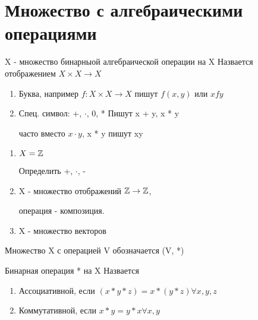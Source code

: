 \section{Множество с алгебраическими операциями}

\begin{definition}
    X - множество бинарныой алгебраической операции на X Назвается отображением $X \times X \to X$
    
    
\end{definition}

\begin{notation}
    \begin{enumerate}
        \item Буква, например $f : X \times X \to X$
        пишут $f(x, y)$ или $x f y$

        \item Спец. символ: +, $\cdot$, 0, *
        Пишут x + y, x * y

        часто вместо $x \cdot y$, x * y пишут xy
    \end{enumerate}

    
\end{notation}

\begin{eg}
\begin{enumerate}
    \item $X = \mathbb{Z}$
    
    Определить +, $\cdot$, -

    \item X - множество отображений $\mathbb{Z} \to \mathbb{Z}$,
    
    операция - композиция.

    \item X - множество векторов
    
\end{enumerate}
\end{eg}

\begin{notation}
    Множество X с операцией V обозначается (V, *)
\end{notation}

\begin{definition}
    Бинарная операция * на X Назвается

    \begin{enumerate}
        \item Ассоциативной, если $(x * y * z) = x * (y * z) \forall x, y, z$
        
        \item Коммутативной, если $x * y = y * x \forall x, y$
    \end{enumerate}
\end{definition}

